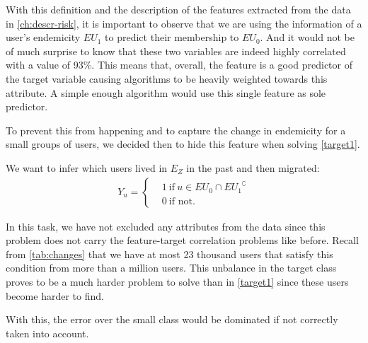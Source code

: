 With this definition and the description of the features extracted from the data in \cref{ch:descr-risk}, it is important to observe that we are using the information of a user's endemicity $EU_{1}$ to predict their membership to $EU_{0}$.
And it would not be of much surprise to know that these two variables are indeed highly correlated with a value of 93\%.
This means that, overall, the feature is a good predictor of the target variable causing algorithms to be heavily weighted towards this attribute.
A simple enough algorithm would use this single feature as sole predictor.

To prevent this from happening and to capture the change in endemicity for a small groups of users, we decided then to hide this feature when solving \cref{target1}.



\begin{problem}\label{target2}
We want to infer which users lived in $E_Z$ in the past and then migrated:
	\begin{align*}
				Y_u =
				\begin{cases}
					&1 \ \mbox{if} \ u \in EU_{0} \cap { EU_{1} }^{\complement}  \\
					&0 \ \mbox{if not}.
				\end{cases}
			\end{align*}
\end{problem}

In this task, we have not excluded any attributes from the data since this problem does not carry the feature-target correlation problems like before.
Recall from \cref{tab:changes} that we have at most 23 thousand users that satisfy this condition from more than a million users.
This unbalance in the target class proves to be a much harder problem to solve than in \cref{target1} since these users become harder to find.

With this, the error over the small class would be dominated if not correctly taken into account.


